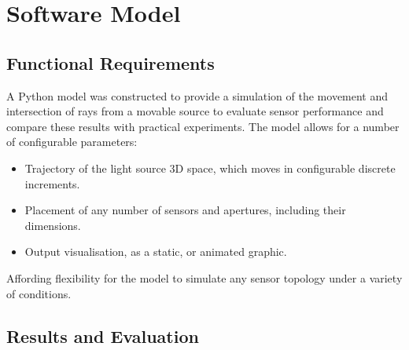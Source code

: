 \section{Software Model}
\label{sec:softwareModel}

\subsection{Functional Requirements}

A Python model was constructed to provide a simulation of the movement and intersection of rays from a movable source to evaluate sensor performance and compare these results with practical experiments.
The model allows for a number of configurable parameters:
\begin{itemize}
    \item Trajectory of the light source 3D space, which moves in configurable discrete increments.
    \item Placement of any number of sensors and apertures, including their dimensions.
    \item Output visualisation, as a static, or animated graphic.
\end{itemize}
Affording flexibility for the model to simulate any sensor topology under a variety of conditions.



\subsection{Results and Evaluation}